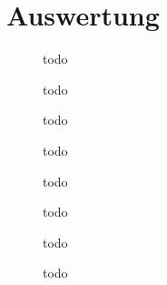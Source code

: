 \section{Auswertung}
\begin{figure}[H]
    \centering
    
    \caption{todo}
    \label{fig:Sonnenabbild}
\end{figure}

\begin{figure}[H]
    \centering
    
    \caption{todo}
    \label{fig:Sonnenkreuz_Az}
\end{figure}

\begin{figure}[H]
    \centering
    
    \caption{todo}
    \label{fig:Sonnenkreuz_Alt}
\end{figure}

\begin{figure}[H]
    \centering
    
    \caption{todo}
    \label{fig:VvonR}
\end{figure}

\begin{figure}[H]
    \centering
    
    \caption{todo}
    \label{fig:Milchstrasse}
\end{figure}

\begin{figure}[H]
    \centering
       
    \caption{todo}
    \label{fig:Milchstrassesafe}
\end{figure}

\begin{figure}[H]
    \centering
       
    \caption{todo}
    \label{fig:Belichtungszeit}
\end{figure}

\begin{figure}[H]
    \centering
       
    \caption{todo}
    \label{fig:BelichtungszeitExtremal}
\end{figure}